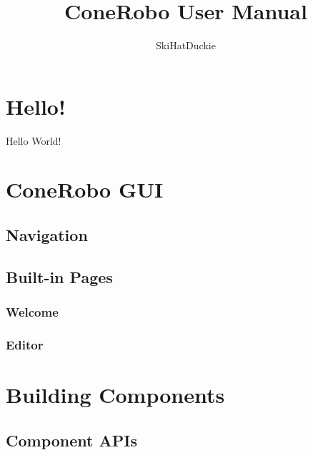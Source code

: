 \documentclass[11pt]{article}
\title{ConeRobo User Manual}
\author{SkiHatDuckie}
\begin{document}
   \maketitle
   \newpage

   \tableofcontents
   \newpage

   \section{Hello!}
   Hello World!

   \section{ConeRobo GUI}
   \subsection{Navigation}
   \subsection{Built-in Pages}
   \subsubsection{Welcome}
   \subsubsection{Editor}

   \section{Building Components}
   \subsection{Component APIs}
\end{document}

